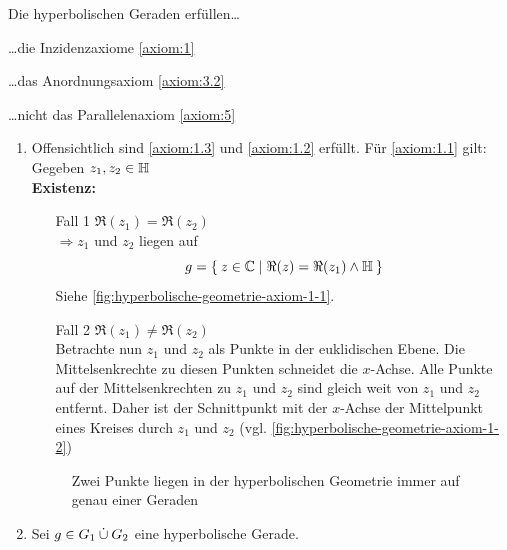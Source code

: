 \begin{bemerkung}
    Die hyperbolischen Geraden erfüllen\dots
    \begin{bemenum}
        \item \dots die Inzidenzaxiome \ref{axiom:1}
        \item \dots das Anordnungsaxiom \ref{axiom:3.2}
        \item \dots nicht das Parallelenaxiom \ref{axiom:5}
    \end{bemenum}
\end{bemerkung}

\begin{beweis}\leavevmode
    \begin{enumerate}[label=\alph*), ref=\theproposition (\alph*)]
        \item Offensichtlich sind \ref{axiom:1.3} und \ref{axiom:1.2}
              erfüllt. Für \ref{axiom:1.1} gilt:\\
              Gegeben $z_1, z_2 \in \mathbb{H}$\\
              \textbf{Existenz:}
            \begin{enumerate}
                \item[Fall 1] $\Re(z_1) = \Re(z_2)$\\
                    $\Rightarrow z_1$ und $z_2$ liegen auf
                    \[g = \Set{z \in \ensuremath{\mathbb{C}}| \Re(z) = \Re(z_1) \land \ensuremath{\mathbb{H}}}\]
                    Siehe \cref{fig:hyperbolische-geometrie-axiom-1-1}.
                \item[Fall 2] $\Re(z_1) \neq \Re(z_2)$\\
                    Betrachte nun $z_1$ und $z_2$ als Punkte in der
                    euklidischen Ebene. Die Mittelsenkrechte zu diesen
                    Punkten schneidet die $x$-Achse. Alle Punkte auf
                    der Mittelsenkrechten zu $z_1$ und $z_2$ sind gleich
                    weit von $z_1$ und $z_2$ entfernt. Daher ist
                    der Schnittpunkt mit der $x$-Achse der Mittelpunkt
                    eines Kreises durch $z_1$ und $z_2$ (vgl. \cref{fig:hyperbolische-geometrie-axiom-1-2})
            \end{enumerate}

            \begin{figure}[ht]
                \centering
                \subfloat[Fall 1]{
                    \resizebox{0.45\linewidth}{!}{}
                    \label{fig:hyperbolische-geometrie-axiom-1-1}
                }%
                \subfloat[Fall 2]{
                    \resizebox{0.45\linewidth}{!}{}
                    \label{fig:hyperbolische-geometrie-axiom-1-2}
                }%
                \label{fig:hyperbolische-geometrie-axiom-1-0}
                \caption{Zwei Punkte liegen in der hyperbolischen Geometrie immer auf genau einer Geraden}
            \end{figure}
        \item Sei $g \in G_1 \mathbin{\dot{\cup}} G_2$ eine hyperbolische Gerade.\\


\end{enumerate}
\end{beweis}
